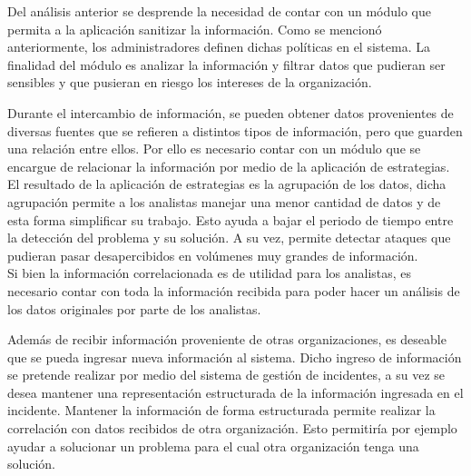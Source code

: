 	Del análisis anterior se desprende la necesidad de contar con un módulo que permita a la aplicación sanitizar la
	información. Como se mencionó anteriormente, los administradores definen dichas políticas en el sistema. La finalidad
	del módulo es analizar la información y filtrar datos que pudieran ser sensibles y que pusieran en riesgo los intereses
	de la organización.


\bigskip

	Durante el intercambio de información, se pueden obtener datos provenientes de diversas fuentes que se refieren a
	distintos tipos de información, pero que guarden una relación entre ellos. Por ello es necesario contar con un módulo
	que se encargue de relacionar la información por medio de la aplicación de estrategias. El resultado de la aplicación
	de estrategias es la agrupación de los datos, dicha agrupación permite a los analistas manejar una menor cantidad de
	datos y de esta forma simplificar su trabajo. Esto ayuda a bajar el periodo de tiempo entre la detección del problema y
	su solución. A su vez, permite detectar ataques que pudieran pasar desapercibidos en volúmenes muy
	grandes de información.	\\
	
	Si bien la información correlacionada es de utilidad para los analistas, es necesario contar con toda la
	información recibida para poder hacer un análisis de los datos originales por parte de los analistas.


\bigskip

	Además de recibir información proveniente de otras organizaciones, es deseable que se pueda ingresar nueva información
	al sistema. Dicho ingreso de información se pretende realizar por medio del sistema de gestión de incidentes, a su vez
	se desea mantener una representación estructurada de la información ingresada en el incidente. Mantener la información
	de forma estructurada permite realizar la correlación con datos recibidos de otra organización. Esto permitiría por
	ejemplo ayudar a solucionar un problema para el cual otra organización tenga una solución.


